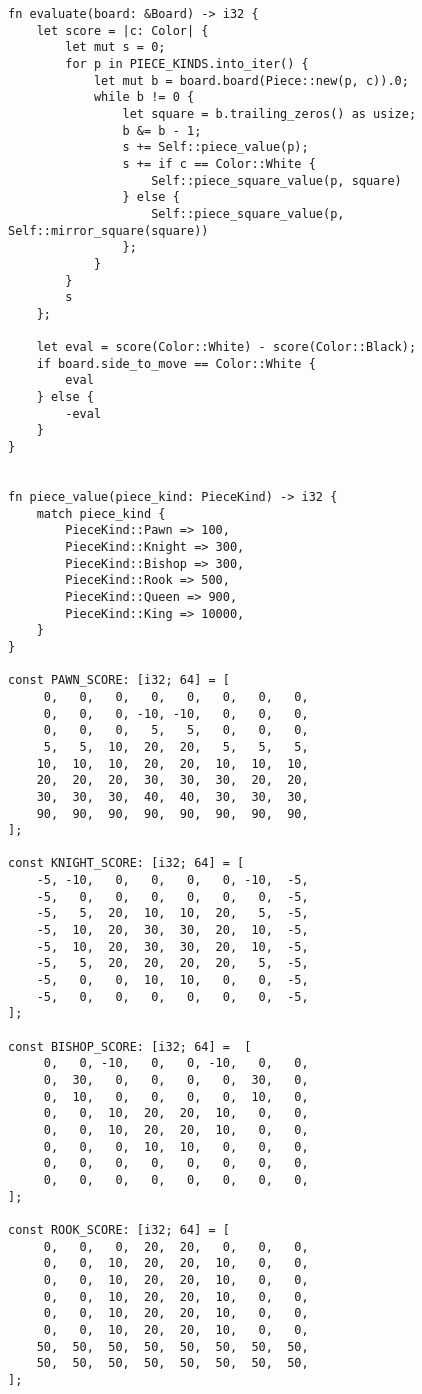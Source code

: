 \begin{lstlisting}[language=RustHtml]
fn evaluate(board: &Board) -> i32 {
    let score = |c: Color| {
        let mut s = 0;
        for p in PIECE_KINDS.into_iter() {
            let mut b = board.board(Piece::new(p, c)).0;
            while b != 0 {
                let square = b.trailing_zeros() as usize;
                b &= b - 1;
                s += Self::piece_value(p);
                s += if c == Color::White {
                    Self::piece_square_value(p, square)
                } else {
                    Self::piece_square_value(p, Self::mirror_square(square))
                };
            }
        }
        s
    };

    let eval = score(Color::White) - score(Color::Black);
    if board.side_to_move == Color::White {
        eval
    } else {
        -eval
    }
}


fn piece_value(piece_kind: PieceKind) -> i32 {
    match piece_kind {
        PieceKind::Pawn => 100,
        PieceKind::Knight => 300,
        PieceKind::Bishop => 300,
        PieceKind::Rook => 500,
        PieceKind::Queen => 900,
        PieceKind::King => 10000,
    }
}

const PAWN_SCORE: [i32; 64] = [
     0,   0,   0,   0,   0,   0,   0,   0,
     0,   0,   0, -10, -10,   0,   0,   0,
     0,   0,   0,   5,   5,   0,   0,   0,
     5,   5,  10,  20,  20,   5,   5,   5,
    10,  10,  10,  20,  20,  10,  10,  10,
    20,  20,  20,  30,  30,  30,  20,  20,
    30,  30,  30,  40,  40,  30,  30,  30,
    90,  90,  90,  90,  90,  90,  90,  90,
];

const KNIGHT_SCORE: [i32; 64] = [
    -5, -10,   0,   0,   0,   0, -10,  -5,
    -5,   0,   0,   0,   0,   0,   0,  -5,
    -5,   5,  20,  10,  10,  20,   5,  -5,
    -5,  10,  20,  30,  30,  20,  10,  -5,
    -5,  10,  20,  30,  30,  20,  10,  -5,
    -5,   5,  20,  20,  20,  20,   5,  -5,
    -5,   0,   0,  10,  10,   0,   0,  -5,
    -5,   0,   0,   0,   0,   0,   0,  -5,
];

const BISHOP_SCORE: [i32; 64] =  [
     0,   0, -10,   0,   0, -10,   0,   0,
     0,  30,   0,   0,   0,   0,  30,   0,
     0,  10,   0,   0,   0,   0,  10,   0,
     0,   0,  10,  20,  20,  10,   0,   0,
     0,   0,  10,  20,  20,  10,   0,   0,
     0,   0,   0,  10,  10,   0,   0,   0,
     0,   0,   0,   0,   0,   0,   0,   0,
     0,   0,   0,   0,   0,   0,   0,   0,
];

const ROOK_SCORE: [i32; 64] = [
     0,   0,   0,  20,  20,   0,   0,   0,
     0,   0,  10,  20,  20,  10,   0,   0,
     0,   0,  10,  20,  20,  10,   0,   0,
     0,   0,  10,  20,  20,  10,   0,   0,
     0,   0,  10,  20,  20,  10,   0,   0,
     0,   0,  10,  20,  20,  10,   0,   0,
    50,  50,  50,  50,  50,  50,  50,  50,
    50,  50,  50,  50,  50,  50,  50,  50,
];


\end{lstlisting}
